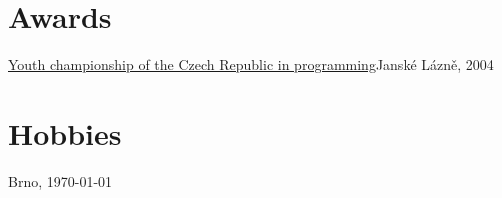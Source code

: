 \documentclass[11pt,a4paper]{moderncv}
\begin{document}
\section{Awards}
    {\href{http://www.stv.cz/pgm_cr/mcr2004vm.html}{Youth championship of the
    Czech Republic in programming}}{Janské Lázně, 2004}{}{}

\section{Hobbies}
\renewcommand{\listitemsymbol}{\Neutral}

\renewcommand{\refname}{Publications, talks}
\makeatletter
\def\mybiblabel#1(#2){\hskip 0pt plus 1filll\relax #2}
\def\@biblabel#1{\mybiblabel #1}
\makeatother
\nocite{*}



\vfill
Brno, \today
\end{document}
